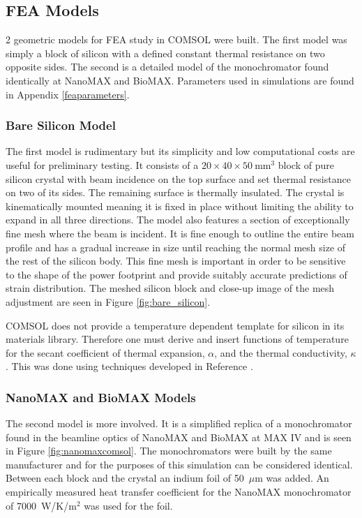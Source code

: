 \documentclass[preprint]{iucr}              %
\begin{document}
\subsection{FEA Models}

2 geometric models for FEA study in COMSOL were built. The first model was simply a block of silicon with a defined constant thermal resistance on two opposite sides. The second is a detailed model of the monochromator found identically at NanoMAX and BioMAX. Parameters used in simulations are found in Appendix \ref{feaparameters}.

\subsubsection{Bare Silicon Model}
The first model is rudimentary but its simplicity and low computational costs are useful for preliminary testing. It consists of a $20\times 40\times 50~$mm$^3$ block of pure silicon crystal with beam incidence on the top surface and set thermal resistance on two of its sides. The remaining surface is thermally insulated. The crystal is kinematically mounted meaning it is fixed in place without limiting the ability to expand in all three directions. The model also features a section of exceptionally fine mesh where the beam is incident. It is fine enough to outline the entire beam profile and has a gradual increase in size until reaching the normal mesh size of the rest of the silicon body. This fine mesh is important in order to be sensitive to the shape of the power footprint and provide suitably accurate predictions of strain distribution. The meshed silicon block and close-up image of the mesh adjustment are seen in Figure \ref{fig:bare_silicon}.

COMSOL does not provide a temperature dependent template for silicon in its materials library. Therefore one must derive and insert functions of temperature for the secant coefficient of thermal expansion, $\alpha$, and the thermal conductivity, $\kappa$. This was done using techniques developed in Reference \cite{mash}.

\subsubsection{NanoMAX and BioMAX Models}
The second model is more involved. It is a simplified replica of a monochromator found in the beamline optics of NanoMAX and BioMAX at MAX IV and is seen in Figure \ref{fig:nanomaxcomsol}. The monochromators were built by the same manufacturer and for the purposes of this simulation can be considered identical. Between each block and the crystal an indium foil of 50~$\mu$m was added. An empirically measured heat transfer coefficient for the NanoMAX monochromator of 7000~W/K/m$^{2}$ was used for the foil.
\end{document}
